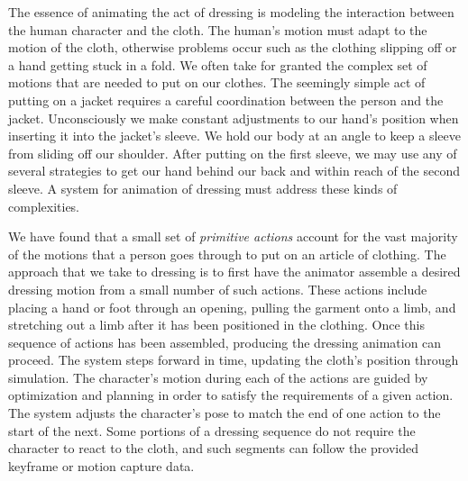 

The essence of animating the act of dressing is modeling the
interaction between the human character and the cloth.  The human's motion
must adapt to the motion of the cloth, otherwise problems occur such as the
clothing slipping off or a hand getting stuck in a fold.  We often take
for granted the complex set of motions that are needed to put on our
clothes.  The seemingly simple act of putting on a jacket requires a
careful coordination between the person and the jacket.  Unconsciously we
make constant adjustments to our hand's position when inserting it into
the jacket's sleeve.  We hold our body at an angle to keep a sleeve from
sliding off our shoulder.  After putting on the first sleeve, we may use
any of several strategies to get our hand behind our back and within reach
of the second sleeve.  A system for animation of dressing must address
these kinds of complexities.

We have found that a small set of \emph{primitive actions} account for the vast
majority of the motions that a person goes through to put on an article of
clothing.  The approach that we take to dressing is to first have the
animator assemble a desired dressing motion from a small number of such
actions.  These actions include placing a hand or foot through an opening,
pulling the garment onto a limb, and stretching out a limb after it has
been positioned in the clothing.  Once this sequence of actions has been
assembled, producing the dressing animation can proceed.  The system steps
forward in time, updating the cloth's position through simulation.  The
character's motion during each of the actions are guided by optimization
and planning in order to satisfy the requirements of a given
action. The system adjusts the character's pose to match the end of one
action to the start of the next. Some portions of a dressing sequence do
not require the character to react to the cloth, and such segments can follow
the provided keyframe or motion capture data.

